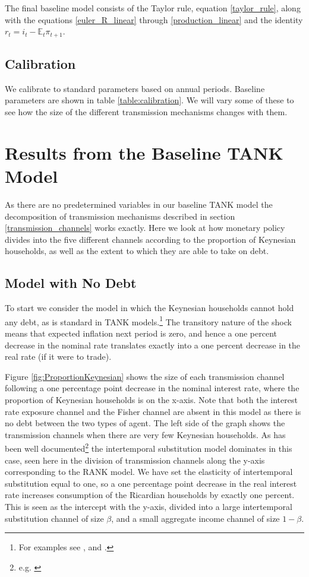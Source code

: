 \documentclass[12pt,a4paper]{article}
\begin{document}
The final baseline model consists of the Taylor rule, equation \ref{taylor_rule}, along with the equations \ref{euler_R_linear} through \ref{production_linear} and the identity $r_t = i_t - \mathbb{E}_t \pi_{t+1}$.

\subsection{Calibration}
We calibrate to standard parameters based on annual periods. Baseline parameters are shown in table \ref{table:calibration}. We will vary some of these to see how the size of the different transmission mechanisms changes with them.



\section{Results from the Baseline TANK Model}
As there are no predetermined variables in our baseline TANK model the decomposition of transmission mechanisms described in section \ref{transmission_channels} works exactly. Here we look at how monetary policy divides into the five different channels according to the proportion of Keynesian households, as well as the extent to which they are able to take on debt.

\subsection{Model with No Debt}
To start we consider the model in which the Keynesian households cannot hold any debt, as is standard in TANK models.\footnote{For examples see \cite{dgHANKTANK}, \cite{gali_understanding_2007} and \cite{broer_2018}.} The transitory nature of the shock means that expected inflation next period is zero, and hence a one percent decrease in the nominal rate translates exactly into a one percent decrease in the real rate (if it were to trade).

Figure \ref{fig:ProportionKeynesian} shows the size of each transmission channel following a one percentage point decrease in the nominal interest rate, where the proportion of Keynesian households is on the x-axis. Note that both the interest rate exposure channel and the Fisher channel are absent in this model as there is no debt between the two types of agent. The left side of the graph shows the transmission channels when there are very few Keynesian households. As has been well documented\footnote{e.g. \cite{kaplan_monetary_2016}} the intertemporal substitution model dominates in this case, seen here in the division of transmission channels along the y-axis corresponding to the RANK model. We have set the elasticity of intertemporal substitution equal to one, so a one percentage point decrease in the real interest rate increases consumption of the Ricardian households by exactly one percent. This is seen as the intercept with the y-axis, divided into a large intertemporal substitution channel of size $\beta$, and a small aggregate income channel of size $1-\beta$.
\end{document}

